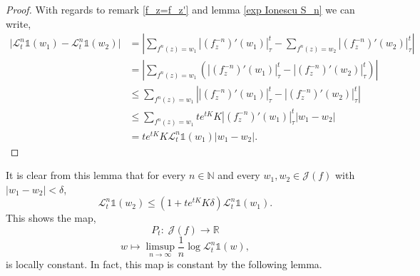 \documentclass[12pt,reqno]{amsart}
\begin{document}
\begin{proof}
With regards to remark \ref{f_z=f_z'} and lemma \ref{exp Ionescu S_n} we can write,
       \begin{align*}
           \big| \mathcal{L}_t^n\mathbb{1}(w_1) - \mathcal{L}_t^n\mathbb{1}(w_2) \big| &= \left| \sum_{f^n(z)=w_1} \left|(f_z^{-n})'(w_1)\right|_{\tau}^t - \sum_{f^n(z)=w_2} \left|(f_z^{-n})'(w_2)\right|_{\tau}^t\right| \\
           & = \left| \sum_{f^n(z)=w_1} \left(\left|(f_z^{-n})'(w_1)\right|_{\tau}^t - \left|(f_z^{-n})'(w_2)\right|_{\tau}^t\right) \right| \\
           & \leq \sum_{f^n(z)=w_1} \left| \left|(f_z^{-n})'(w_1)\right|_{\tau}^t - \left|(f_z^{-n})'(w_2)\right|_{\tau}^t \right| \\
           & \leq \sum_{f^n(z)=w_1} te^{tK}K\left|(f_z^{-n})'(w_1)\right|_{\tau}^t|w_1-w_2| \\
           & =  te^{tK}K\mathcal{L}_t^n\mathbb{1}(w_1)|w_1-w_2|.
        \end{align*}
\end{proof}
\noindent It is clear from this lemma that for every $n \in \mathbb{N}$ and every $w_1, w_2 \in \mathcal{J}(f)$ with $|w_1-w_2|< \delta$,
$$\mathcal{L}_t^n\mathbb{1}(w_2) \leq (1+te^{tK}K\delta)\mathcal{L}_t^n\mathbb{1}(w_1).$$
\noindent This shows the map,
$$P_t: \;\mathcal{J}(f) \rightarrow \mathbb{R}$$
$$w \mapsto \limsup_{n \to \infty}\dfrac{1}{n}\log \mathcal{L}_t^n\mathbb{1}(w),$$
is locally constant. In fact, this map is constant by the following lemma.
\end{document}
